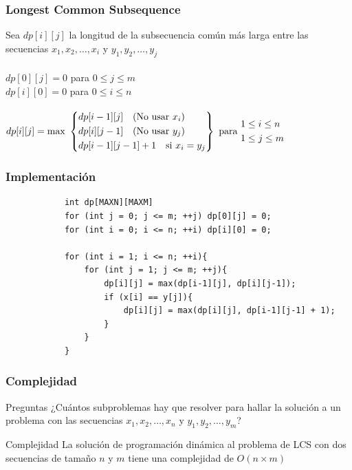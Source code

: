 \documentclass{beamer}
\begin{document}
	\begin{frame}
		\frametitle{Longest Common Subsequence}
		Sea $dp[i][j]$ la longitud de la subsecuencia común más larga entre las secuencias $x_1, x_2, \ldots, x_i$ y $y_1, y_2, \ldots, y_j$ \\ 
		\quad \\
		$dp[0][j] = 0$ \quad para $0 \leq j \leq m$ \\
		$dp[i][0] = 0$ \quad para $0 \leq i \leq n$ \\ \quad \\
		$ 
		dp[i][j] = \text{max } 
		\left\{
			\begin{aligned}
				& dp[i-1][j] \text{\quad (No usar }x_i \text{)}\\
				& dp[i][j-1] \text{\quad (No usar }y_j \text{)}\\
				& dp[i-1][j-1] + 1\text{\quad si } x_i = y_j \\
			\end{aligned}
		\right\}
		\text{ para } 
			\begin{aligned}
				& 1 \leq i \leq n\\
				& 1 \leq j \leq m
			\end{aligned}
		$
	\end{frame}
	
	\begin{frame}[fragile]
		\frametitle{Implementación}
		\begin{lstlisting}
			int dp[MAXN][MAXM]
			for (int j = 0; j <= m; ++j) dp[0][j] = 0;
			for (int i = 0; i <= n; ++i) dp[i][0] = 0;

			for (int i = 1; i <= n; ++i){
			    for (int j = 1; j <= m; ++j){
			        dp[i][j] = max(dp[i-1][j], dp[i][j-1]);
			        if (x[i] == y[j]){
			            dp[i][j] = max(dp[i][j], dp[i-1][j-1] + 1);
			        }
			    }
			}
		\end{lstlisting}
	\end{frame}

	\begin{frame}
		\frametitle{Complejidad}
		\begin{alertblock}{Preguntas}
			¿Cuántos subproblemas hay que resolver para hallar la solución a un problema con las secuencias $x_1, x_2, \ldots, x_n$ y $y_1, y_2, \ldots, y_m$?
		\end{alertblock}
		\pause
		\begin{block}{Complejidad}
			La solución de programación dinámica al problema de LCS con dos secuencias de tamaño $n$ y $m$ tiene una complejidad de $O(n \times m)$
		\end{block}
	\end{frame}
\end{document}
